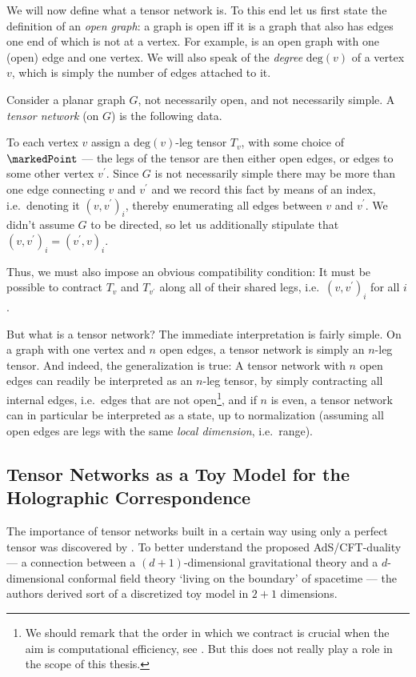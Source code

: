 \bigno We will now define what a tensor network is. To this end let us first state the definition of an \emph{open graph}: a graph is open iff it is a graph that also has edges one end of which is not at a vertex. For example,  is an open graph with one (open) edge and one vertex. We will also speak of the \emph{degree} $\mathrm{deg}(v)$ of a vertex $v$, which is simply the number of edges attached to it.

\begin{definition}
Consider a planar graph $G$, not necessarily open, and not necessarily simple. A \emph{tensor network} (on $G$) is the following data.

To each vertex $v$ assign a $\mathrm{deg}(v)$-leg tensor $T_v$, with some choice of $\markedPoint$ --- the legs of the tensor are then either open edges, or edges to some other vertex $v^\prime$. Since $G$ is not necessarily simple there may be more than one edge connecting $v$ and $v^\prime$ and we record this fact by means of an index, i.e.\ denoting it $(v, v^\prime)_i$, thereby enumerating all edges between $v$ and $v^\prime$. We didn't assume $G$ to be directed, so let us additionally stipulate that $(v, v^\prime)_i = (v^\prime, v)_i$.
 
Thus, we must also impose an obvious compatibility condition: It must be possible to contract $T_v$ and $T_{v^\prime}$ along all of their shared legs, i.e.\ $(v, v^\prime)_i$ for all $i$.
\end{definition}
But what is a tensor network? The immediate interpretation is fairly simple. On a graph with one vertex and $n$ open edges, a tensor network is simply an $n$-leg tensor. And indeed, the generalization is true: A tensor network with $n$ open edges can readily be interpreted as an $n$-leg tensor, by simply contracting all internal edges, i.e.\ edges that are not open\footnote{We should remark that the order in which we contract is crucial when the aim is computational efficiency, see \cite[p.\ 10]{TN_orus}. But this does not really play a role in the scope of this thesis.}, and if $n$ is even, a tensor network can in particular be interpreted as a state, up to normalization (assuming all open edges are legs with the same \emph{local dimension}, i.e.\ range).

\subsection*{Tensor Networks as a Toy Model for the Holographic Correspondence}
The importance of tensor networks built in a certain way using only a perfect tensor was discovered by \cite{Pastawski2015Holographic}. To better understand the proposed AdS/CFT-duality --- a connection between a $(d+1)$-dimensional gravitational theory and a $d$-dimensional conformal field theory `living on the boundary' of spacetime --- the authors derived sort of a discretized toy model in $2+1$ dimensions. 

